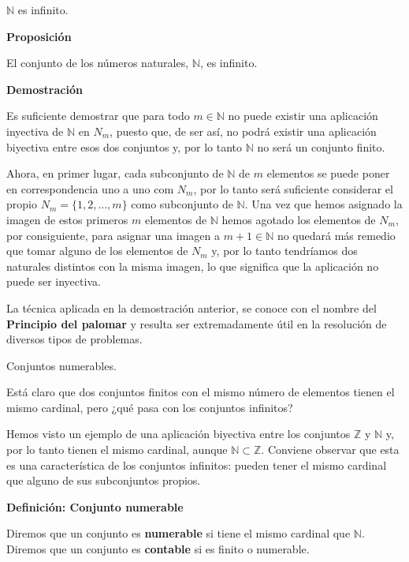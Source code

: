 \documentclass[
  ignorenonframetext,
]{beamer}
\begin{document}
\begin{frame}{\(\mathbb{N}\) es infinito.}
\protect\hypertarget{mathbbn-es-infinito.}{}

\textbf{Proposición}

El conjunto de los números naturales, \(\mathbb{N}\), es infinito.

\textbf{Demostración}

Es suficiente demostrar que para todo \(m \in \mathbb{N}\) no puede
existir una aplicación inyectiva de \(\mathbb{N}\) en \(N_m\), puesto
que, de ser así, no podrá existir una aplicación biyectiva entre esos
dos conjuntos y, por lo tanto \(\mathbb{N}\) no será un conjunto finito.

Ahora, en primer lugar, cada subconjunto de \(\mathbb{N}\) de \(m\)
elementos se puede poner en correspondencia uno a uno com \(N_m\), por
lo tanto será suficiente considerar el propio
\(N_m = \{1,2, \ldots, m\}\) como subconjunto de \(\mathbb{N}\). Una vez
que hemos asignado la imagen de estos primeros \(m\) elementos de
\(\mathbb{N}\) hemos agotado los elementos de \(N_m\), por consiguiente,
para asignar una imagen a \(m+1 \in \mathbb{N}\) no quedará más remedio
que tomar alguno de los elementos de \(N_m\) y, por lo tanto tendríamos
dos naturales distintos con la misma imagen, lo que significa que la
aplicación no puede ser inyectiva.

La técnica aplicada en la demostración anterior, se conoce con el nombre
del \textbf{Principio del palomar} y resulta ser extremadamente útil en
la resolución de diversos tipos de problemas.

\end{frame}

\begin{frame}{Conjuntos numerables.}
\protect\hypertarget{conjuntos-numerables.}{}

Está claro que dos conjuntos finitos con el mismo número de elementos
tienen el mismo cardinal, pero ¿qué pasa con los conjuntos infinitos?

Hemos visto un ejemplo de una aplicación biyectiva entre los conjuntos
\(\mathbb{Z}\) y \(\mathbb{N}\) y, por lo tanto tienen el mismo
cardinal, aunque \(\mathbb{N} \subset \mathbb{Z}\). Conviene observar
que esta es una característica de los conjuntos infinitos: pueden tener
el mismo cardinal que alguno de sus subconjuntos propios.

\textbf{Definición: Conjunto numerable}

Diremos que un conjunto es \textbf{numerable} si tiene el mismo cardinal
que \(\mathbb{N}\). Diremos que un conjunto es \textbf{contable} si es
finito o numerable.

\end{frame}
\end{document}
